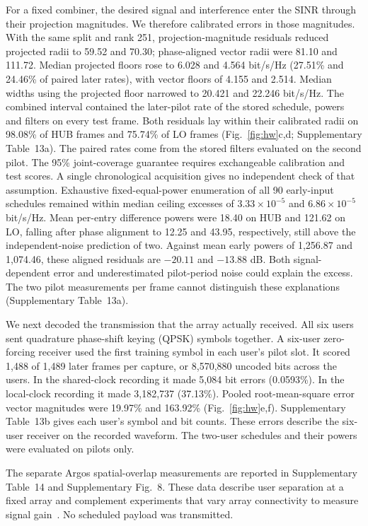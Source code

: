 For a fixed combiner, the desired signal and interference enter the SINR through their projection magnitudes. We therefore calibrated errors in those magnitudes. With the same split and rank 251, projection-magnitude residuals reduced projected radii to 59.52 and 70.30; phase-aligned vector radii were 81.10 and 111.72. Median projected floors rose to 6.028 and 4.564 bit/s/Hz (27.51\% and 24.46\% of paired later rates), with vector floors of 4.155 and 2.514. Median widths using the projected floor narrowed to 20.421 and 22.246 bit/s/Hz. The combined interval contained the later-pilot rate of the stored schedule, powers and filters on every test frame. Both residuals lay within their calibrated radii on 98.08\% of HUB frames and 75.74\% of LO frames (Fig.~\ref{fig:hw}c,d; Supplementary Table~13a). The paired rates come from the stored filters evaluated on the second pilot. The 95\% joint-coverage guarantee requires exchangeable calibration and test scores. A single chronological acquisition gives no independent check of that assumption. Exhaustive fixed-equal-power enumeration of all 90 early-input schedules remained within median ceiling excesses of \(3.33\times10^{-5}\) and \(6.86\times10^{-5}\) bit/s/Hz. Mean per-entry difference powers were 18.40 on HUB and 121.62 on LO, falling after phase alignment to 12.25 and 43.95, respectively, still above the independent-noise prediction of two. Against mean early powers of 1,256.87 and 1,074.46, these aligned residuals are \(-20.11\) and \(-13.88\) dB. Both signal-dependent error and underestimated pilot-period noise could explain the excess. The two pilot measurements per frame cannot distinguish these explanations (Supplementary Table~13a).


We next decoded the transmission that the array actually received. All six users sent quadrature phase-shift keying (QPSK) symbols together. A six-user zero-forcing receiver used the first training symbol in each user's pilot slot. It scored 1,488 of 1,489 later frames per capture, or 8,570,880 uncoded bits across the users. In the shared-clock recording it made 5,084 bit errors (0.0593\%). In the local-clock recording it made 3,182,737 (37.13\%). Pooled root-mean-square error vector magnitudes were 19.97\% and 163.92\% (Fig.~\ref{fig:hw}e,f). Supplementary Table~13b gives each user's symbol and bit counts. These errors describe the six-user receiver on the recorded waveform. The two-user schedules and their powers were evaluated on pilots only.

The separate Argos spatial-overlap measurements are reported in Supplementary Table~14 and Supplementary Fig.~8. These data describe user separation at a fixed array and complement experiments that vary array connectivity to measure signal gain~\cite{ni2026}. No scheduled payload was transmitted.

